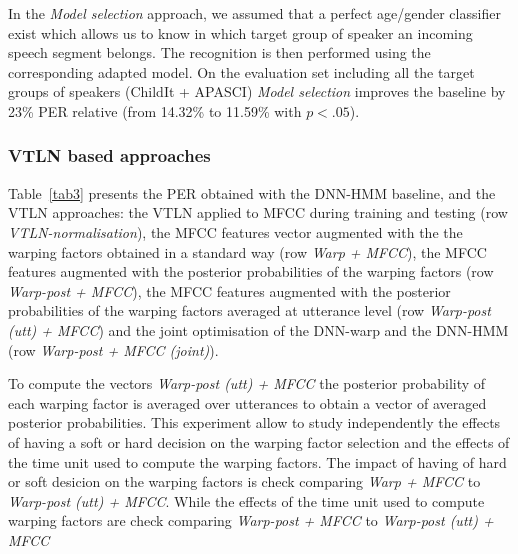 \documentclass{nle}
\begin{document}
In the {\em Model selection} approach, we assumed that a perfect age/gender classifier exist which allows us to know in which target group of speaker an incoming speech segment belongs. The recognition is then performed using the corresponding adapted model. On the evaluation set including all the target groups of speakers (ChildIt + APASCI) {\em Model selection} improves the baseline by 23\% PER relative (from 14.32\% to 11.59\% with $p<.05$).

\subsubsection{VTLN based approaches}
Table~\ref{tab3}  presents the PER obtained with the DNN-HMM baseline, and the VTLN approaches: the VTLN applied to MFCC during training and testing (row {\em VTLN-normalisation}), the MFCC features vector augmented with the the warping factors obtained in a standard way (row {\em Warp + MFCC}), the MFCC features augmented with the posterior probabilities of the warping factors (row {\em Warp-post + MFCC}), the MFCC features augmented with the posterior probabilities of the warping factors averaged at utterance level (row {\em Warp-post (utt) + MFCC}) and the joint optimisation of the DNN-warp and the DNN-HMM (row {\em Warp-post + MFCC (joint)}). 

To compute the vectors {\em Warp-post (utt) + MFCC} the posterior probability of each warping factor is averaged over utterances to obtain a vector of averaged posterior probabilities. This experiment allow to study independently the effects of having a soft or hard decision on the warping factor selection and the effects of the time unit used to compute the warping factors. The impact of having of hard or soft desicion on the warping factors is check comparing {\em Warp + MFCC} to {\em Warp-post (utt) + MFCC}. While the effects of the time unit used to compute warping factors are check comparing {\em Warp-post + MFCC} to {\em Warp-post (utt) + MFCC}
\end{document}
